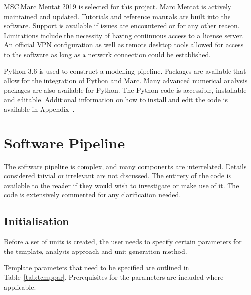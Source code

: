 MSC.Marc Mentat 2019 is selected for this project. Marc Mentat is actively maintained and updated. Tutorials and reference manuals are built into the software. Support is available if issues are encountered or for any other reason. Limitations include the necessity of having continuous access to a license server. An official VPN configuration as well as remote desktop tools allowed for access to the software as long as a network connection could be established.

Python 3.6 is used to construct a modelling pipeline. Packages are available that allow for the integration of Python and Marc. Many advanced numerical analysis packages are also available for Python. The Python code is accessible, installable and editable. Additional information on how to install and edit the code is available in Appendix~.

\section{Software Pipeline}
\label{sec:SW}

The software pipeline is complex, and many components are interrelated. Details considered trivial or irrelevant are not discussed. The entirety of the code is available to the reader if they would wish to investigate or make use of it. The code is extensively commented for any clarification needed.

\subsection{Initialisation}
\label{ssec:init}

Before a set of units is created, the user needs to specify certain parameters for the template, analysis approach and unit generation method.

Template parameters that need to be specified are outlined in Table~\ref{tab:temppar}. Prerequisites for the parameters are included where applicable.

